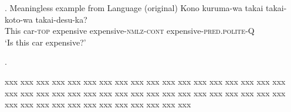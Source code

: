 \documentclass[a5paper,12pt]{article}
\begin{document}
%
%
%
%

\blindtext{}

\ex. Meaningless example from Language (original)
\gll Kono kuruma-wa takai  takai-koto-wa takai-desu-ka?\\ 
This car-\textsc{top} expensive expensive-\textsc{nmlz}-\textsc{cont} expensive-\textsc{pred}.\textsc{polite}-Q\\
`Is this car expensive?'



\mfssetposformat{\scshape}
\glsetfirstlineformat{\color{blue}}

\ex. %

xxx xxx xxx xxx xxx xxx xxx xxx xxx xxx xxx xxx xxx xxx xxx xxx xxx xxx xxx xxx xxx xxx xxx xxx xxx xxx xxx xxx xxx xxx xxx xxx xxx xxx xxx xxx xxx xxx xxx xxx xxx xxx xxx xxx xxx xxx xxx xxx 
\end{document}
